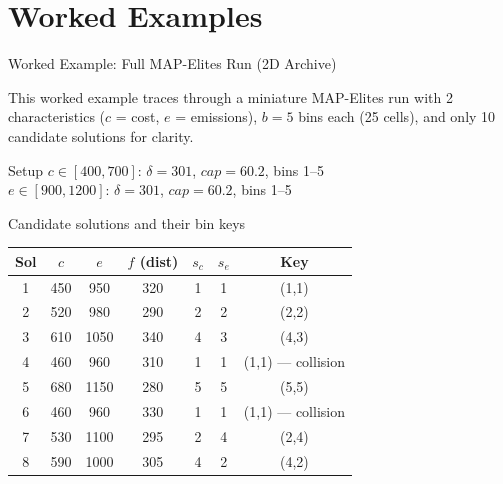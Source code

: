\documentclass[aspectratio=169,10pt]{beamer}
\begin{document}
\section{Worked Examples}

\begin{frame}[allowframebreaks]{Worked Example: Full MAP-Elites Run (2D Archive)}

This worked example traces through a miniature MAP-Elites run with
2 characteristics ($c$ = cost, $e$ = emissions), $b=5$ bins each
(25 cells), and only 10 candidate solutions for clarity.

\medskip
\begin{block}{Setup}
$c \in [400, 700]$: $\delta = 301$, $cap = 60.2$, bins 1--5 \\
$e \in [900, 1200]$: $\delta = 301$, $cap = 60.2$, bins 1--5
\end{block}

\medskip
\begin{exampleblock}{Candidate solutions and their bin keys}
\begin{center}
\renewcommand{\arraystretch}{1.2}
\begin{tabular}{ccccccc}
\toprule
Sol & $c$ & $e$ & $f$ (dist) & $s_c$ & $s_e$ & Key \\
\midrule
1 & 450 & 950  & 320 & 1 & 1 & (1,1) \\
2 & 520 & 980  & 290 & 2 & 2 & (2,2) \\
3 & 610 & 1050 & 340 & 4 & 3 & (4,3) \\
4 & 460 & 960  & 310 & 1 & 1 & (1,1) --- collision \\
5 & 680 & 1150 & 280 & 5 & 5 & (5,5) \\
6 & 460 & 960  & 330 & 1 & 1 & (1,1) --- collision \\
7 & 530 & 1100 & 295 & 2 & 4 & (2,4) \\
8 & 590 & 1000 & 305 & 4 & 2 & (4,2) \\
\bottomrule
\end{tabular}
\end{center}
\end{exampleblock}


\end{frame}
\end{document}
